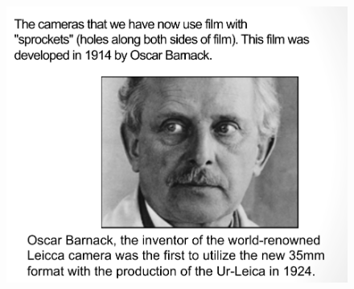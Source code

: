 \documentclass{beamer}
\begin{document}
\begin{frame}
	\begin{figure}
		\centering
		\includegraphics[scale=0.4]{106.jpg}
	\end{figure}
\end{frame}
\end{document}
